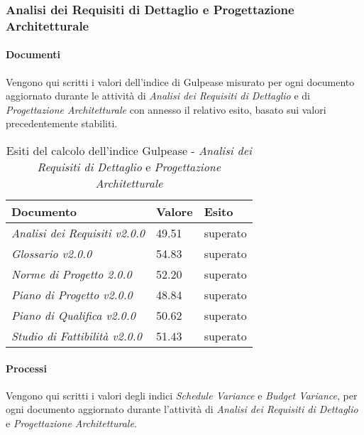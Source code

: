      \label{AdR_Dettaglio}
    \subsubsection{Analisi dei Requisiti di Dettaglio e Progettazione Architetturale}
    \paragraph{Documenti} \Spazio
    Vengono qui scritti i valori dell'indice di Gulpease misurato per ogni documento aggiornato durante le attività di \textit{Analisi dei Requisiti di Dettaglio} e di \emph{Progettazione Architetturale} con annesso il relativo esito, basato sui valori precedentemente stabiliti.
    
    \begin{table}[H]
    	\centering
    	\begin{tabular}{|C{7cm}|C{2cm}|C{2cm}|}
    		\hline
    		\textbf{Documento} & \textbf{Valore} & \textbf{Esito}  \\
    		\hline
    		\textit{Analisi dei Requisiti v2.0.0} & 49.51 & superato \\
    		\hline
    		\textit{Glossario v2.0.0} & 54.83 & superato \\
    		\hline
    		\textit{Norme di Progetto 2.0.0} & 52.20 & superato \\
    		\hline
    		\textit{Piano di Progetto v2.0.0} & 48.84 & superato \\
    		\hline
    		\textit{Piano di Qualifica v2.0.0} & 50.62 & superato \\
    		\hline
    		\textit{Studio di Fattibilità v2.0.0} & 51.43 & superato \\
    		\hline
    		
    	\end{tabular}
    	\caption{Esiti del calcolo dell'indice Gulpease - \textit{Analisi dei Requisiti di Dettaglio} e \textit{Progettazione Architetturale}}
    \end{table}
    \paragraph{Processi} \Spazio
    Vengono qui scritti i valori degli indici \textit{Schedule Variance} e \textit{Budget Variance}, per ogni documento aggiornato durante l'attività di \textit{Analisi dei Requisiti di Dettaglio} e \textit{Progettazione Architetturale}. 
    
